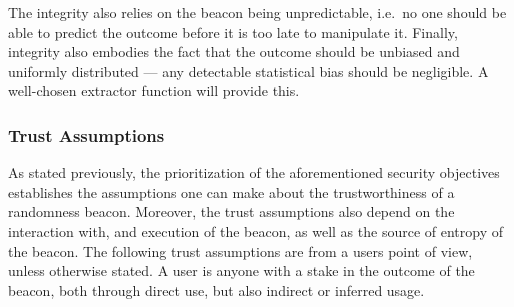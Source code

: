 \begin{description}
        The integrity also relies on the beacon being unpredictable, i.e.\ no one should be able to predict the outcome before it is too late to manipulate it.
        Finally, integrity also embodies the fact that the outcome should be unbiased and uniformly distributed --- any detectable statistical bias should be negligible. A well-chosen extractor function will provide this.

\end{description}

\subsubsection{Trust Assumptions}\label{ssub:trust_assumptions}
As stated previously, the prioritization of the aforementioned security objectives establishes the assumptions one can make about the trustworthiness of a randomness beacon.
Moreover, the trust assumptions also depend on the interaction with, and execution of the beacon, as well as the source of entropy of the beacon.
The following trust assumptions are from a users point of view, unless otherwise stated.
A user is anyone with a stake in the outcome of the beacon, both through direct use, but also indirect or inferred usage.
